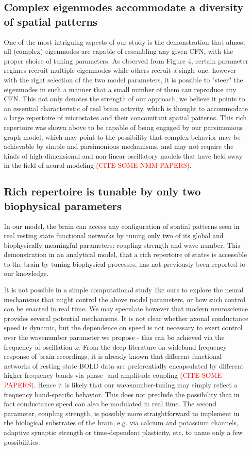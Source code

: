 \documentclass{article}
\begin{document}
\subsection{Complex eigenmodes accommodate a diversity of spatial patterns}
One of the most intriguing aspects of our study is the demonstration that almost all (complex) eigenmodes are capable of resembling any given CFN, with the proper choice of tuning parameters. As observed from Figure 4, certain parameter regimes recruit multiple eigenmodes while others recruit a single one; however with the right selection of the two model parameters, it is possible to "steer" the eigenmodes in such a manner that a small number of them can reproduce any CFN. This not only denotes the strength of our approach, we believe it points to an essential characteristic of real brain activity, which is thought to accommodate a large repertoire of microstates and their concomitant spatial patterns. This rich repertoire was shown above to be capable of being engaged by our parsimonious graph model, which may point to the possibility that complex behavior may be achievable by simple and parsimonious mechanisms, and may not require the kinds of high-dimensional and non-linear oscillatory models that have held sway in the field of neural modeling \textcolor{red}{(CITE SOME NMM PAPERS)}.

\subsection{Rich repertoire is tunable by only two biophysical parameters}
In our model, the brain can access any configuration of spatial patterns seen in real resting state functional networks by tuning only two of its global and biophysically meaningful parameters: coupling strength and wave number. This demonstration in an analytical model, that a rich repertoire of states is accessible to the brain by tuning biophysical processes, has not previously been reported to our knowledge.

It is not possible in a simple computational study like ours to explore the neural mechanisms that might control the above model parameters, or how such control can be enacted in real time. We may speculate however that modern neuroscience provides several potential mechanisms. It is not clear whether axonal conductance speed is dynamic, but the dependence on speed is not necessary to exert control over the wavenumber parameter we propose - this can be achieved via the frequency of oscillation $\omega$. From the deep literature on wideband frequency response of brain recordings, it is already known that different functional networks of resting state BOLD data are preferentially encapsulated by different higher-frequency bands via phase- and amplitude-coupling \textcolor{red}{(CITE SOME PAPERS)}. Hence it is likely that our wavenumber-tuning may simply reflect a frequency band-specific behavior. This does not preclude the possibility that in fact conductance speed can also be modulated in real time. The second parameter, coupling strength, is possibly more straightforward to implement in the biological substrates of the brain, e.g. via calcium and potassium channels, adaptive synaptic strength or time-dependent plasticity, etc, to name only a few possibilities.
\end{document}
